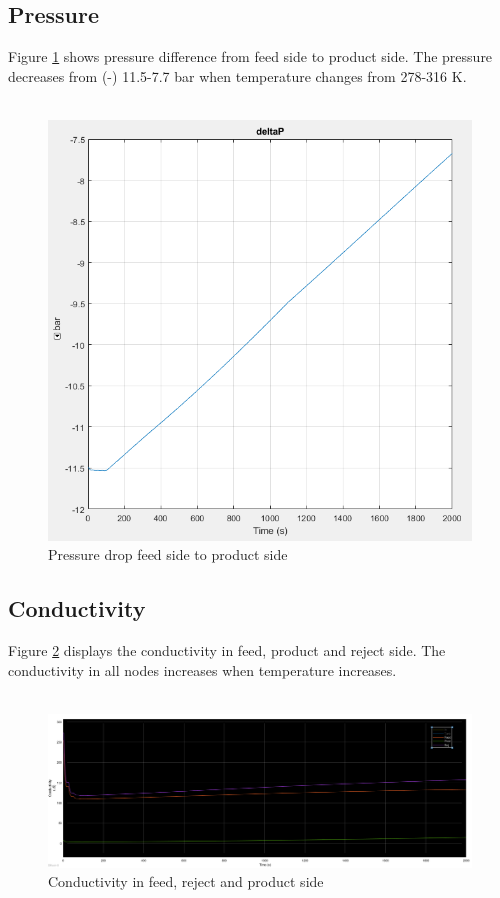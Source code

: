 \subsection{Pressure}
Figure \ref{fig:deltap} shows pressure difference from feed side to product side. The pressure decreases from (-) 11.5-7.7 bar when temperature changes from 278-316 K. \\
\\
\begin{figure}[h]
  \centering
  \includegraphics[width=0.5\linewidth]{deltap.PNG}
  \caption{Pressure drop feed side to product side}
  \label{fig:deltap}
\end{figure}

\subsection{Conductivity}
Figure \ref{fig:conden} displays the conductivity in feed, product and reject side. The conductivity in all nodes increases when temperature increases.\\
\\
\begin{figure}[h]
  \label{fig:conden}
  \includegraphics[width=1.1\linewidth]{cond.PNG}
  \caption{Conductivity in feed, reject and product side}
\end{figure}

\newpage


